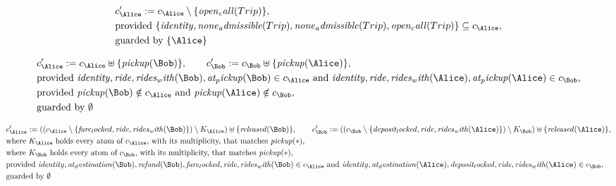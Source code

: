 \begin{align*}
&
c'_
{
\Alice
}
 := 
c_
{
\Alice
}
 \setminus 
\{
\mathit{
open_call
}
(
Trip
)
\}
,\\
&
\text{provided } 
\{
\mathit{
identity
}
,
\mathit{
none_admissible
}
(
Trip
)
,
\mathit{
none_admissible
}
(
Trip
)
,
\mathit{
open_call
}
(
Trip
)
\}
 \subseteq c_
{
\Alice
}
,\\
&
\text{guarded by } \{
\Alice
\}
\end{align*}

\begin{align*}
&
c'_
{
\Alice
}
 := 
c_
{
\Alice
}
 \uplus 
\{
\mathit{
pickup
}
(
\Bob
)
\}
, \qquad 
c'_
{
\Bob
}
 := 
c_
{
\Bob
}
 \uplus 
\{
\mathit{
pickup
}
(
\Alice
)
\}
,\\
&
\text{provided } 
\mathit{
identity
}
,
\mathit{
ride
}
,
\mathit{
rides_with
}
(
\Bob
)
,
\mathit{
at_pickup
}
(
\Bob
)
 \in c_
{
\Alice
}
 \text{ and } 
\mathit{
identity
}
,
\mathit{
ride
}
,
\mathit{
rides_with
}
(
\Alice
)
,
\mathit{
at_pickup
}
(
\Alice
)
 \in c_
{
\Bob
}
,\\
&
\text{provided } 
\mathit{
pickup
}
(
\Bob
)
 \notin c_
{
\Alice
}
 \text{ and } 
\mathit{
pickup
}
(
\Alice
)
 \notin c_
{
\Bob
}
,\\
&
\text{guarded by } \emptyset
\end{align*}

\begin{align*}
&
c'_
{
\Alice
}
 := 
(
(c_
{
\Alice
}
 \setminus 
\{
\mathit{
fare_locked
}
,
\mathit{
ride
}
,
\mathit{
rides_with
}
(
\Bob
)
\}
) \setminus K_
{
\Alice
}
) \uplus 
\{
\mathit{
released
}
(
\Bob
)
\}
, \qquad 
c'_
{
\Bob
}
 := 
(
(c_
{
\Bob
}
 \setminus 
\{
\mathit{
deposit_locked
}
,
\mathit{
ride
}
,
\mathit{
rides_with
}
(
\Alice
)
\}
) \setminus K_
{
\Bob
}
) \uplus 
\{
\mathit{
released
}
(
\Alice
)
\}
,\\
&
\text{where } K_
{
\Alice
}
 \text{ holds every atom of } c_
{
\Alice
}
 \text{, with its multiplicity, that matches } 
\mathit{
pickup
}
(
\ast
)
,\\
&
\text{where } K_
{
\Bob
}
 \text{ holds every atom of } c_
{
\Bob
}
 \text{, with its multiplicity, that matches } 
\mathit{
pickup
}
(
\ast
)
,\\
&
\text{provided } 
\mathit{
identity
}
,
\mathit{
at_destination
}
(
\Bob
)
,
\mathit{
refund
}
(
\Bob
)
,
\mathit{
fare_locked
}
,
\mathit{
ride
}
,
\mathit{
rides_with
}
(
\Bob
)
 \in c_
{
\Alice
}
 \text{ and } 
\mathit{
identity
}
,
\mathit{
at_destination
}
(
\Alice
)
,
\mathit{
deposit_locked
}
,
\mathit{
ride
}
,
\mathit{
rides_with
}
(
\Alice
)
 \in c_
{
\Bob
}
,\\
&
\text{guarded by } \emptyset
\end{align*}
